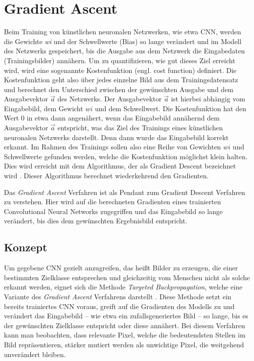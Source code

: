 \chapter{Gradient Ascent}
\label{cha:gascent}

Beim Training von künstlichen neuronalen Netzwerken, wie etwa \ac{CNN}, werden die Gewichte \textit{wi} und der Schwellwerte (Bias) so lange verändert und im Modell des Netzwerks gespeichert, bis die Ausgabe aus dem Netzwerk die Eingabedaten (Trainingsbilder) annähern. Um zu quantifizieren, wie gut dieses Ziel erreicht wird, wird eine sogenannte Kostenfunktion (engl. cost function) definiert. 
Die Kostenfunktion geht also über jedes einzelne Bild aus dem Trainingsdatensatz und berechnet den Unterschied zwischen der gewünschten Ausgabe und dem Ausgabevektor $\vec{a}$ des Netzwerks.
Der Ausgabevektor $\vec{a}$ ist hierbei abhängig vom Eingabebild, dem Gewicht $wi$ und dem Schwellwert.
Die Kostenfunktion hat den Wert 0 in etwa dann angenähert, wenn das Eingabebild annähernd dem Ausgabevektor $\vec{a}$ entspricht, was das Ziel des Trainings eines künstlichen neuronalen Netzwerks darstellt. Denn dann wurde das Eingabebild korrekt erkannt.
Im Rahmen des Trainings sollen also eine Reihe von Gewichten $wi$ und Schwellwerte gefunden werden, welche die Kostenfunktion möglichst klein halten. 
Dies wird erreicht mit dem Algorithmus, der als Gradient Descent bezeichnet wird \cite{zhou_understanding_2018}.
Dieser Algorithmus berechnet wiederkehrend den Gradienten. 


Das \textit{Gradient Ascent} Verfahren ist als Pendant zum Gradient Descent Verfahren zu verstehen. Hier wird auf die berechneten Gradienten eines trainierten Convolutional Neural Networks zugegriffen und das Eingabebild so lange verändert, bis dies dem gewünschten Ergebnisbild entspricht.


\section{Konzept}
Um gegebene \ac{CNN} gezielt anzugreifen, das heißt Bilder zu erzeugen, die einer bestimmten Zielklasse entsprechen und gleichzeitig vom Menschen nicht als solche erkannt werden, eignet sich die Methode \textit{Targeted Backpropagation}, welche eine Variante des \textit{Gradient Ascent} Verfahrens darstellt \cite{liu_delving_2016}.
Diese Methode setzt ein bereits trainiertes \ac{CNN} voraus, greift auf die Gradienten des Modells zu und verändert das Eingabebild – wie etwa ein zufallsgeneriertes Bild – so lange, bis es der gewünschten Zielklasse entspricht oder diese annähert. 
Bei diesem Verfahren kann man beobachten, dass relevante Pixel, welche die bedeutendsten Stellen im Bild repräsentieren, stärker mutiert werden als unwichtige Pixel, die weitgehend unverändert bleiben.


